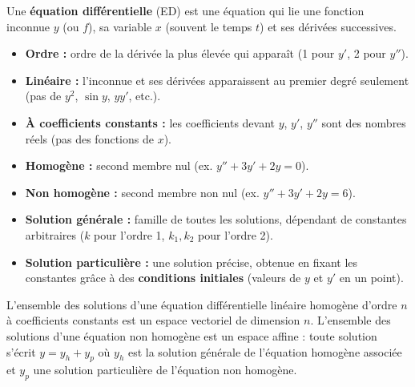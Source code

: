 \documentclass[11pt]{article}
\newcounter{popsec}
\newcounter{popsub}
\newcommand{\courssub}[1]{%
  \stepcounter{popsub}%
  \par\vspace{9pt}\noindent{\popxbold\fontsize{11.5}{13}\selectfont\color{popink}{\color{poporange}\thepopsec.\thepopsub}\hspace{6pt}#1}\par\nopagebreak\vspace{4pt}
}
\begin{document}
\begin{definition}
Une \textbf{équation différentielle} (ED) est une équation qui lie une fonction inconnue $y$ (ou $f$), sa variable $x$ (souvent le temps $t$) et ses dérivées successives.
\begin{itemize}
\item \textbf{Ordre :} ordre de la dérivée la plus élevée qui apparaît (1 pour $y'$, 2 pour $y''$).
\item \textbf{Linéaire :} l'inconnue et ses dérivées apparaissent au premier degré seulement (pas de $y^2$, $\sin y$, $y y'$, etc.).
\item \textbf{À coefficients constants :} les coefficients devant $y$, $y'$, $y''$ sont des nombres réels (pas des fonctions de $x$).
\item \textbf{Homogène :} second membre nul (ex. $y'' + 3y' + 2y = 0$).
\item \textbf{Non homogène :} second membre non nul (ex. $y'' + 3y' + 2y = 6$).
\item \textbf{Solution générale :} famille de toutes les solutions, dépendant de constantes arbitraires ($k$ pour l'ordre 1, $k_1, k_2$ pour l'ordre 2).
\item \textbf{Solution particulière :} une solution précise, obtenue en fixant les constantes grâce à des \textbf{conditions initiales} (valeurs de $y$ et $y'$ en un point).
\end{itemize}
\end{definition}

\begin{propriete}
L'ensemble des solutions d'une équation différentielle linéaire homogène d'ordre $n$ à coefficients constants est un espace vectoriel de dimension $n$.
L'ensemble des solutions d'une équation non homogène est un espace affine : toute solution s'écrit $y = y_h + y_p$ où $y_h$ est la solution générale de l'équation homogène associée et $y_p$ une solution particulière de l'équation non homogène.
\end{propriete}

\courssub{Équations du type $y' = ay$}
\end{document}
